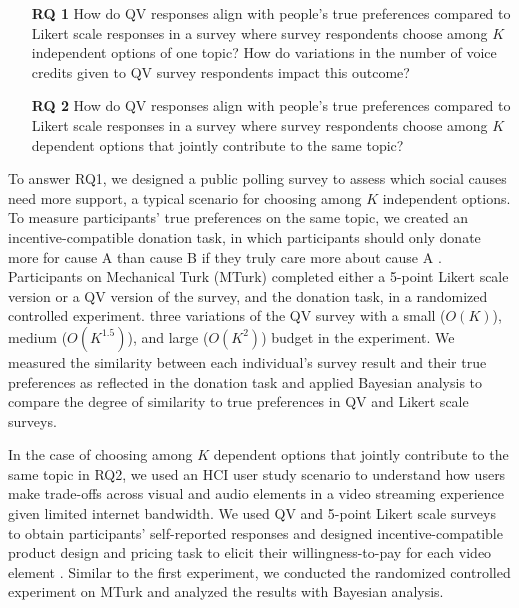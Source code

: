 \begin{itemize}
    \item[\textbf{RQ 1}] How do QV responses align with people's true preferences compared to Likert scale responses in a survey where survey respondents choose among $K$ independent options of one topic? How do variations in the number of voice credits given to QV survey respondents impact this outcome?

    \item[\textbf{RQ 2}] How do QV responses align with people's true preferences compared to Likert scale responses in a survey where survey respondents choose among $K$ dependent options that jointly contribute to the same topic? 
\end{itemize}

To answer RQ1, we designed a public polling survey to assess which social causes need more support, a typical scenario for choosing among $K$ independent options. To measure participants' true preferences on the same topic, we created an incentive-compatible donation task, in which participants should only donate more for cause A than cause B if they truly care more about cause A \cite{champ1997using}. Participants on Mechanical Turk (MTurk) completed either a 5-point Likert scale version or a QV version of the survey, and the donation task, in a randomized controlled experiment.  three variations of the QV survey with a small ($O(K)$), medium ($O(K^{1.5})$), and large ($O(K^2)$) budget in the experiment. We measured the similarity between each individual's survey result and their true preferences as reflected in the donation task and applied Bayesian analysis to compare the degree of similarity to true preferences in QV and Likert scale surveys.

In the case of choosing among $K$ dependent options that jointly contribute to the same topic in RQ2, we used an HCI user study scenario to understand how users make trade-offs across visual and audio elements in a video streaming experience given limited internet bandwidth. We used QV and 5-point Likert scale surveys to obtain participants' self-reported responses and designed  incentive-compatible product design and pricing task to elicit their willingness-to-pay for each video element \cite{roth1982incentive}. Similar to the first experiment, we conducted the randomized controlled experiment on MTurk and analyzed the results with Bayesian analysis.

